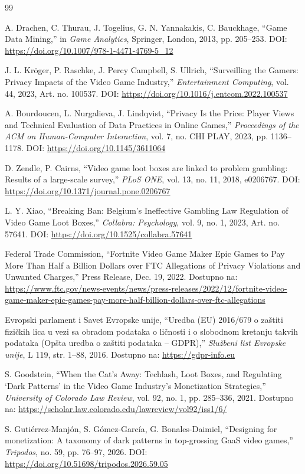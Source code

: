 \documentclass[12pt]{article}
\begin{document}
\begin{thebibliography}{99}

A. Drachen, C. Thurau, J. Togelius, G. N. Yannakakis, C. Bauckhage, ``Game Data Mining,'' in \textit{Game Analytics}, Springer, London, 2013, pp. 205--253. DOI: \url{https://doi.org/10.1007/978-1-4471-4769-5_12}

J. L. Kröger, P. Raschke, J. Percy Campbell, S. Ullrich, ``Surveilling the Gamers: Privacy Impacts of the Video Game Industry,'' \textit{Entertainment Computing}, vol. 44, 2023, Art. no. 100537. DOI: \url{https://doi.org/10.1016/j.entcom.2022.100537}

A. Bourdoucen, L. Nurgalieva, J. Lindqvist, ``Privacy Is the Price: Player Views and Technical Evaluation of Data Practices in Online Games,'' \textit{Proceedings of the ACM on Human-Computer Interaction}, vol. 7, no. CHI PLAY, 2023, pp. 1136--1178. DOI: \url{https://doi.org/10.1145/3611064}

D. Zendle, P. Cairns, ``Video game loot boxes are linked to problem gambling: Results of a large-scale survey,'' \textit{PLoS ONE}, vol. 13, no. 11, 2018, e0206767. DOI: \url{https://doi.org/10.1371/journal.pone.0206767}

L. Y. Xiao, ``Breaking Ban: Belgium's Ineffective Gambling Law Regulation of Video Game Loot Boxes,'' \textit{Collabra: Psychology}, vol. 9, no. 1, 2023, Art. no. 57641. DOI: \url{https://doi.org/10.1525/collabra.57641}

Federal Trade Commission, ``Fortnite Video Game Maker Epic Games to Pay More Than Half a Billion Dollars over FTC Allegations of Privacy Violations and Unwanted Charges,'' Press Release, Dec. 19, 2022. Dostupno na: \url{https://www.ftc.gov/news-events/news/press-releases/2022/12/fortnite-video-game-maker-epic-games-pay-more-half-billion-dollars-over-ftc-allegations}

Evropski parlament i Savet Evropske unije, ``Uredba (EU) 2016/679 o zaštiti fizičkih lica u vezi sa obradom podataka o ličnosti i o slobodnom kretanju takvih podataka (Opšta uredba o zaštiti podataka -- GDPR),'' \textit{Službeni list Evropske unije}, L 119, str. 1--88, 2016. Dostupno na: \url{https://gdpr-info.eu}

S. Goodstein, ``When the Cat's Away: Techlash, Loot Boxes, and Regulating `Dark Patterns' in the Video Game Industry's Monetization Strategies,'' \textit{University of Colorado Law Review}, vol. 92, no. 1, pp. 285--336, 2021. Dostupno na: \url{https://scholar.law.colorado.edu/lawreview/vol92/iss1/6/}

S. Gutiérrez-Manjón, S. Gómez-García, G. Bonales-Daimiel, ``Designing for monetization: A taxonomy of dark patterns in top-grossing GaaS video games,'' \textit{Tripodos}, no. 59, pp. 76--97, 2026. DOI: \url{https://doi.org/10.51698/tripodos.2026.59.05}

\end{thebibliography}
\end{document}
